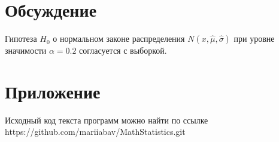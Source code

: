 \section{Обсуждение}
Гипотеза $H_0$ о нормальном законе распределения $N(x, \hat{\mu}, \hat{\sigma})$ при уровне значимости $\alpha = 0.2$ согласуется с выборкой.

\section{Приложение}
Исходный код текста программ можно найти по ссылке \\ https://github.com/mariiabav/MathStatistics.git 